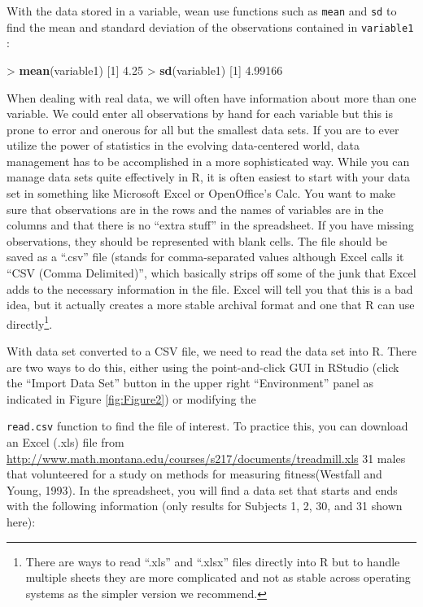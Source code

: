 \documentclass[]{book}
\newenvironment{Shaded}{\begin{snugshade}}{\end{snugshade}}
\newcommand{\KeywordTok}[1]{\textcolor[rgb]{0.13,0.29,0.53}{\textbf{{#1}}}}
\newcommand{\DecValTok}[1]{\textcolor[rgb]{0.00,0.00,0.81}{{#1}}}
\newcommand{\FloatTok}[1]{\textcolor[rgb]{0.00,0.00,0.81}{{#1}}}
\newcommand{\StringTok}[1]{\textcolor[rgb]{0.31,0.60,0.02}{{#1}}}
\newcommand{\NormalTok}[1]{{#1}}
\let\rmarkdownfootnote\footnote%
\def\footnote{\protect\rmarkdownfootnote}
\begin{document}
With the data stored in a variable, wean use functions such as
\texttt{mean} and \texttt{sd} to find the mean and standard deviation of
the observations contained in \texttt{variable1} :

\begin{Shaded}
\begin{Highlighting}[]
\NormalTok{>}\StringTok{ }\KeywordTok{mean}\NormalTok{(variable1)}
\NormalTok{[}\DecValTok{1}\NormalTok{] }\FloatTok{4.25}
\NormalTok{>}\StringTok{ }\KeywordTok{sd}\NormalTok{(variable1)}
\NormalTok{[}\DecValTok{1}\NormalTok{] }\FloatTok{4.99166}
\end{Highlighting}
\end{Shaded}

When dealing with real data, we will often have information about more
than one variable. We could enter all observations by hand for each
variable but this is prone to error and onerous for all but the smallest
data sets. If you are to ever utilize the power of statistics in the
evolving data-centered world, data management has to be accomplished in
a more sophisticated way. While you can manage data sets quite
effectively in R, it is often easiest to start with your data set in
something like Microsoft Excel or OpenOffice's Calc. You want to make
sure that observations are in the rows and the names of variables are in
the columns and that there is no ``extra stuff'' in the spreadsheet. If
you have missing observations, they should be represented with blank
cells. The file should be saved as a ``.csv'' file (stands for
comma-separated values although Excel calls it ``CSV (Comma
Delimited)'', which basically strips off some of the junk that Excel
adds to the necessary information in the file. Excel will tell you that
this is a bad idea, but it actually creates a more stable archival
format and one that R can use directly\footnote{There are ways to read
  ``.xls'' and ``.xlsx'' files directly into R but to handle multiple
  sheets they are more complicated and not as stable across operating
  systems as the simpler version we recommend.}.

With data set converted to a CSV file, we need to read the data set into
R. There are two ways to do this, either using the point-and-click GUI
in RStudio (click the ``Import Data Set'' button in the upper right
``Environment'' panel as indicated in Figure \ref{fig:Figure2}) or
modifying the

\texttt{read.csv} function to find the file of interest. To practice
this, you can download an Excel (.xls) file from
\url{http://www.math.montana.edu/courses/s217/documents/treadmill.xls}
31 males that volunteered for a study on methods for measuring
fitness(Westfall and Young, 1993). In the spreadsheet, you will find a
data set that starts and ends with the following information (only
results for Subjects 1, 2, 30, and 31 shown here):
\end{document}
